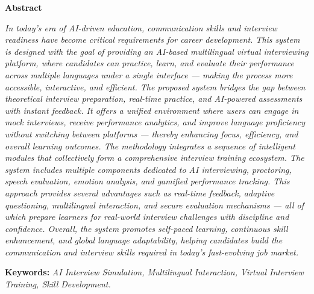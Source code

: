 \documentclass[12pt]{article}
\begin{document}
	
	\begin{center}
		{\Large \bf Abstract}
	\end{center}

    \vspace{20pt}
	
	\onehalfspacing %
	
	\textit{In today’s era of AI-driven education, communication skills and interview readiness have become critical requirements for career development. This system is designed with the goal of providing an AI-based multilingual virtual interviewing platform, where candidates can practice, learn, and evaluate their performance across multiple languages under a single interface — making the process more accessible, interactive, and efficient. The proposed system bridges the gap between theoretical interview preparation, real-time practice, and AI-powered assessments with instant feedback. It offers a unified environment where users can engage in mock interviews, receive performance analytics, and improve language proficiency without switching between platforms — thereby enhancing focus, efficiency, and overall learning outcomes. The methodology integrates a sequence of intelligent modules that collectively form a comprehensive interview training ecosystem. The system includes multiple components dedicated to AI interviewing, proctoring, speech evaluation, emotion analysis, and gamified performance tracking. This approach provides several advantages such as real-time feedback, adaptive questioning, multilingual interaction, and secure evaluation mechanisms — all of which prepare learners for real-world interview challenges with discipline and confidence. Overall, the system promotes self-paced learning, continuous skill enhancement, and global language adaptability, helping candidates build the communication and interview skills required in today’s fast-evolving job market.}
	
	\vspace{1em} %
	
	\noindent
	\textbf{Keywords:}\textit{ AI Interview Simulation, Multilingual Interaction, Virtual Interview Training, Skill Development.}
	
\end{document}
